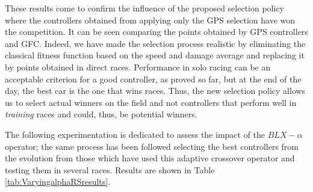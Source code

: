 \documentclass[10pt,journal,compsoc]{IEEEtran}
\begin{document}
These results come to confirm the influence of the proposed selection policy where the controllers obtained from applying only the GPS selection have won the competition. It can be seen comparing the points obtained by GPS controllers and GFC.
Indeed, we have made the selection process realistic by eliminating
the classical fitness function based on the speed and damage average
and replacing it by points obtained in direct races. 
Performance in solo racing can be an acceptable criterion for a good
controller, as proved so far, but at the end of the day, the best car
is the one that wins races. Thus, the new selection policy allows us
to select actual winners on the field and not controllers that perform
well in {\em training} races and could, thus, be potential winners.


The following experimentation is dedicated to assess the impact of the
$BLX-\alpha$ operator; the same process has been followed
selecting the best controllers from the evolution from those which
have used this adaptive crossover operator and testing them in several
races. Results are shown in Table \ref{tab:VaryingalphaRSresults}. 
\end{document}

